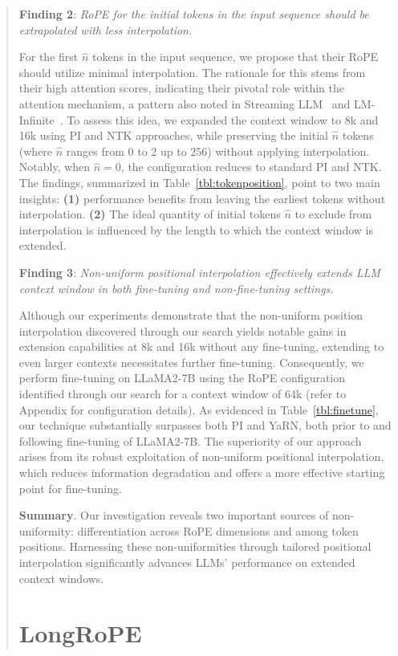 \begin{abstract}
\textbf{Finding 2}: \textit{RoPE for the initial tokens in the input sequence should be extrapolated with less interpolation.} 

For the first $\hat{n}$ tokens in the input sequence, we propose that their RoPE should utilize minimal interpolation. The rationale for this stems from their high attention scores, indicating their pivotal role within the attention mechanism, a pattern also noted in Streaming LLM~\cite{streamingllm} and LM-Infinite~\cite{han2023lminfinite}. To assess this idea, we expanded the context window to 8k and 16k using PI and NTK approaches, while preserving the initial  $\hat n$ tokens (where $\hat n$ ranges from 0 to 2 up to 256) without applying interpolation. Notably, when $\hat n = 0$, the configuration reduces to standard PI and NTK. The findings, summarized in Table~\ref{tbl:tokenposition}, point to two main insights: \textbf{(1)} performance benefits from leaving the earliest tokens without interpolation. \textbf{(2)} The ideal quantity of initial tokens $\hat n$ to exclude from interpolation is influenced by the length to which the context window is extended.

\textbf{Finding 3}: \textit{Non-uniform positional interpolation effectively extends LLM context window in both fine-tuning and non-fine-tuning settings.} 

Although our experiments demonstrate that the non-uniform position interpolation discovered through our search yields notable gains in extension capabilities at 8k and 16k without any fine-tuning, extending to even larger contexts necessitates further fine-tuning. Consequently, we perform fine-tuning on LLaMA2-7B using the RoPE configuration identified through our search for a context window of 64k (refer to Appendix for configuration details). As evidenced in Table~\ref{tbl:finetune}, our technique substantially surpasses both PI and YaRN, both prior to and following fine-tuning of LLaMA2-7B. The superiority of our approach arises from its robust exploitation of non-uniform positional interpolation, which reduces information degradation and offers a more effective starting point for fine-tuning.

\textbf{Summary}. Our investigation reveals two important sources of non-uniformity: differentiation across RoPE dimensions and among token positions. Harnessing these non-uniformities through tailored positional interpolation significantly advances LLMs’ performance on extended context windows.

\section{LongRoPE}


\end{abstract}
